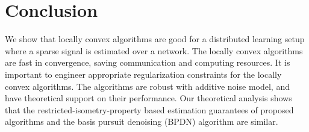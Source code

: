 \documentclass[journal]{IEEEtran}
\begin{document}
%






\section{Conclusion}
\label{sec:conclusion}
We show that locally convex algorithms are good for a distributed learning setup where a sparse signal is estimated over a network. The locally convex algorithms are fast in convergence, saving communication and computing resources. It is important to engineer appropriate regularization constraints for the locally convex algorithms. The algorithms are robust with additive noise model, and have theoretical support on their performance. Our theoretical analysis shows that the restricted-isometry-property based estimation guarantees of proposed algorithms and the basis pursuit denoising (BPDN) algorithm are similar.  
\end{document}
